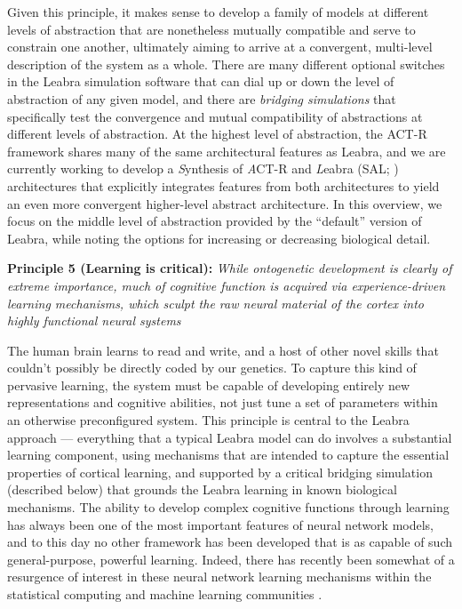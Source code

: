 \documentclass[11pt,twoside]{article}
\begin{document}
Given this principle, it makes sense to develop a family of models at
different levels of abstraction that are nonetheless mutually compatible and
serve to constrain one another, ultimately aiming to arrive at a convergent,
multi-level description of the system as a whole.  There are many different
optional switches in the Leabra simulation software that can dial up or down
the level of abstraction of any given model, and there are {\em bridging
  simulations} that specifically test the convergence and mutual compatibility
of abstractions at different levels of abstraction.  At the highest level of
abstraction, the ACT-R framework shares many of the same architectural
features as Leabra, and we are currently working to develop a {\em S}ynthesis
of {\em A}CT-R and {\em L}eabra (SAL; )
architectures that explicitly integrates features from both architectures to
yield an even more convergent higher-level abstract architecture.  In this
overview, we focus on the middle level of abstraction provided by the
``default'' version of Leabra, while noting the options for increasing or
decreasing biological detail.

{\bf Principle 5 (Learning is critical):} {\em While ontogenetic development
  is clearly of extreme importance, much of cognitive function is acquired via
  experience-driven learning mechanisms, which sculpt the raw neural material
  of the cortex into highly functional neural systems}

The human brain learns to read and write, and a host of other novel skills
that couldn't possibly be directly coded by our genetics.  To capture this
kind of pervasive learning, the system must be capable of developing entirely
new representations and cognitive abilities, not just tune a set of parameters
within an otherwise preconfigured system.  This principle is central to the
Leabra approach --- everything that a typical Leabra model can do involves a
substantial learning component, using mechanisms that are intended to capture
the essential properties of cortical learning, and supported by a critical
bridging simulation (described below) that grounds the Leabra learning in
known biological mechanisms.  The ability to develop complex cognitive
functions through learning has always been one of the most important features
of neural network models, and to this day no other framework has been
developed that is as capable of such general-purpose, powerful learning.
Indeed, there has recently been somewhat of a resurgence of interest in these
neural network learning mechanisms within the statistical computing and
machine learning communities \cite{RBM,schmidhuber,undirectedbayes,etc}.  
\end{document}
